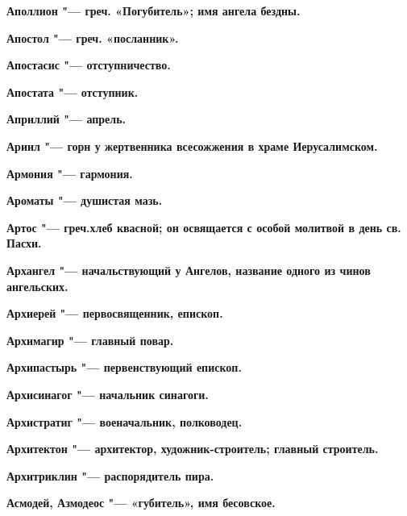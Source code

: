 \begin{multicols}{2}
\bfseries Аполлион\normalfont{} "--- греч. «Погубитель»; имя ангела бездны. 




\bfseries Апостол\normalfont{} "--- греч. «посланник». 




\bfseries Апостасис\normalfont{} "--- отступничество. 




\bfseries Апостата\normalfont{} "--- отступник. 




\bfseries Априллий\normalfont{} "--- апрель. 




\bfseries Ариил\normalfont{} "--- горн у жертвенника всесожжения в храме Иерусалимском. 




\bfseries Армония\normalfont{} "--- гармония. 




\bfseries Ароматы\normalfont{} "--- душистая мазь. 




\bfseries Артос\normalfont{} "--- греч.хлеб квасной; он освящается с особой молитвой в день св. Пасхи. 




\bfseries Архангел\normalfont{} "--- начальствующий у Ангелов, название одного из чинов ангельских. 




\bfseries Архиерей\normalfont{} "--- первосвященник, епископ. 




\bfseries Архимагир\normalfont{} "--- главный повар. 




\bfseries Архипастырь\normalfont{} "--- первенствующий епископ. 




\bfseries Архисинагог\normalfont{} "--- начальник синагоги. 




\bfseries Архистратиг\normalfont{} "--- военачальник, полководец. 




\bfseries Архитектон\normalfont{} "--- архитектор, художник-строитель; главный строитель. 




\bfseries Архитриклин\normalfont{} "--- распорядитель пира. 




\bfseries Асмодей, Азмодеос\normalfont{} "--- «губитель», имя бесовское. 





\end{multicols}
